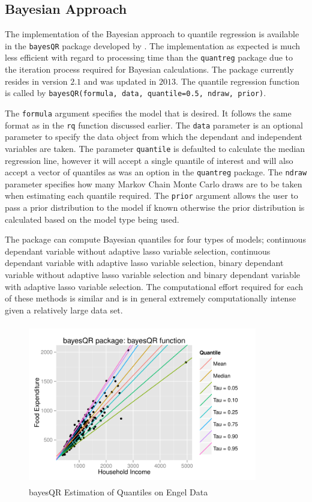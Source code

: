 \documentclass[12pt,a4paper]{report}
\begin{document}
\subsection{Bayesian Approach}
The implementation of the Bayesian approach to quantile regression is available in the {\small\verb"bayesQR"} package developed by . The implementation as expected is much less efficient with regard to processing time than the {\small\verb"quantreg"} package due to the iteration process required for Bayesian calculations. The package currently resides in version $2.1$ and was updated in $2013$. The quantile regression function is called by {\small\verb"bayesQR(formula, data, quantile=0.5, ndraw, prior)"}.
\vspace{2mm}

The {\small\verb"formula"} argument specifies the model that is desired. It follows the same format as in the {\small\verb"rq"} function discussed earlier. The {\small\verb"data"} parameter is an optional parameter to specify the data object from which the dependant and independent variables are taken. The parameter {\small\verb"quantile"} is defaulted to calculate the median regression line, however it will accept a single quantile of interest and will also accept a vector of quantiles as was an option in the {\small\verb"quantreg"} package. The {\small\verb"ndraw"} parameter specifies how many Markov Chain Monte Carlo draws are to be taken when estimating each quantile required. The {\small\verb"prior"} argument allows the user to pass a prior distribution to the model if known otherwise the prior distribution is calculated based on the model type being used.
\vspace{2mm}

The package can compute Bayesian quantiles for four types of models; continuous dependant variable without adaptive lasso variable selection, continuous dependant variable with adaptive lasso variable selection, binary dependant variable without adaptive lasso variable selection and binary dependant variable with adaptive lasso variable selection. The computational effort required for each of these methods is similar and is in general extremely computationally intense given a relatively large data set.

\begin{figure}[ht]\centering
    \includegraphics[width=10cm,height=7cm]{PlotofBayesQR.pdf}
    \caption{bayesQR Estimation of Quantiles on Engel Data}
    \label{plot:bayesQR-example}
\end{figure}
\end{document}
